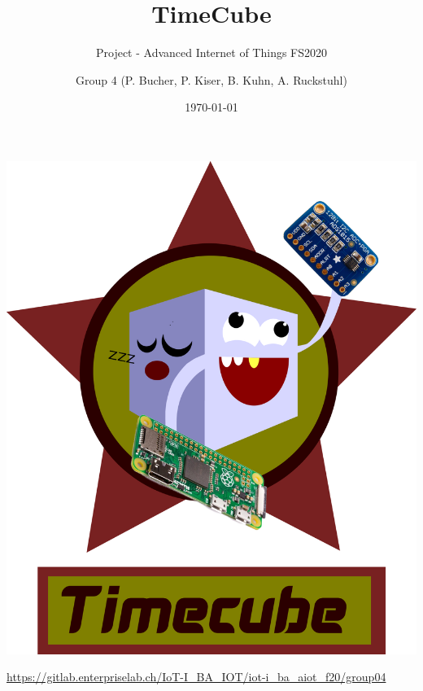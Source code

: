 \documentclass[a3paper,20pt,hidelinks]{scrartcl}
\begin{document}
\author{Group 4 (P. Bucher, P. Kiser, B. Kuhn, A. Ruckstuhl)}
\title{TimeCube}
\subtitle{Project - Advanced Internet of Things FS2020}
\date{\today}
\maketitle

\centering
\includegraphics[width=0.7\linewidth]{../logo/timecube_logo_full_latin1.png}

\vspace{1.25em}



\small
\url{https://gitlab.enterpriselab.ch/IoT-I_BA_IOT/iot-i_ba_aiot_f20/group04}
\end{document}
